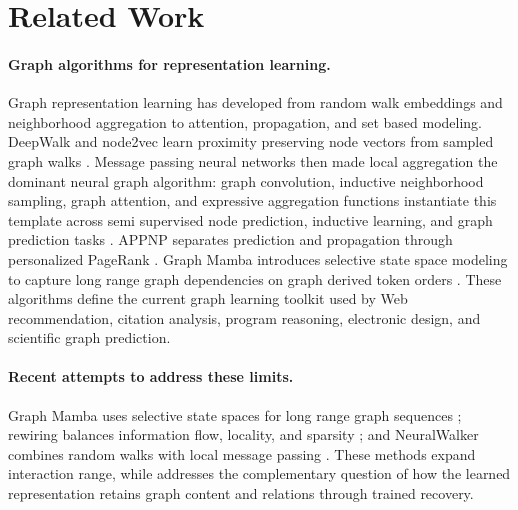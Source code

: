\section{Related Work}
\label{sec:related}

\paragraph{Graph algorithms for representation learning.}
Graph representation learning has developed from random walk embeddings and
neighborhood aggregation to attention, propagation, and set based modeling.
DeepWalk and node2vec learn proximity preserving node vectors from sampled graph
walks \cite{perozzi2014,grover2016}.  Message passing neural networks then made
local aggregation the dominant neural graph algorithm: graph convolution,
inductive neighborhood sampling, graph attention, and expressive aggregation
functions instantiate this template across semi supervised node prediction,
inductive learning, and graph prediction tasks
\cite{gilmer2017,kipf2017,hamilton2017,velickovic2018,xu2019}.  APPNP separates
prediction and propagation through personalized PageRank
\cite{gasteiger2019}.  Graph Mamba introduces selective state space modeling to
capture long range graph dependencies on graph derived token orders
\cite{wang2024graphmamba}.
These algorithms define the current graph learning toolkit used by Web
recommendation, citation analysis, program reasoning, electronic design, and
scientific graph prediction.

\paragraph{Recent attempts to address these limits.}
Graph Mamba uses selective state spaces for long range graph sequences
\cite{wang2024graphmamba}; rewiring balances information flow, locality, and
sparsity \cite{barbero2024locality}; and NeuralWalker combines random walks
with local message passing \cite{chen2025neuralwalker}.  These methods expand
interaction range, while \method{} addresses the complementary question of how
the learned representation retains graph content and relations through trained
recovery.

